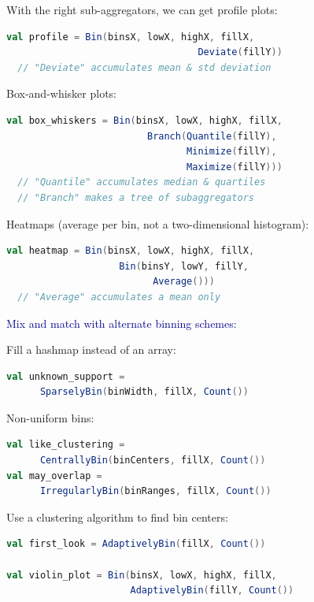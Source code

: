 \documentclass{beamer}
\begin{document}
\begin{frame}[fragile]{}
\vspace{0.5 cm}
With the right sub-aggregators, we can get profile plots:
\begin{lstlisting}[language=scala]
val profile = Bin(binsX, lowX, highX, fillX,
                                  Deviate(fillY))
  // "Deviate" accumulates mean & std deviation
\end{lstlisting}

Box-and-whisker plots:
\begin{lstlisting}[language=scala]
val box_whiskers = Bin(binsX, lowX, highX, fillX,
                         Branch(Quantile(fillY),
                                Minimize(fillY),
                                Maximize(fillY)))
  // "Quantile" accumulates median & quartiles
  // "Branch" makes a tree of subaggregators
\end{lstlisting}

Heatmaps (average per bin, not a two-dimensional histogram):
\begin{lstlisting}[language=scala]
val heatmap = Bin(binsX, lowX, highX, fillX,
                    Bin(binsY, lowY, fillY,
                          Average()))
  // "Average" accumulates a mean only
\end{lstlisting}
\end{frame}

\begin{frame}[fragile]{}
\textcolor{darkblue}{\large Mix and match with alternate binning schemes:}

\vspace{0.5 cm}
Fill a hashmap instead of an array:
\begin{lstlisting}[language=scala]
val unknown_support =
      SparselyBin(binWidth, fillX, Count())
\end{lstlisting}

Non-uniform bins:
\begin{lstlisting}[language=scala]
val like_clustering =
      CentrallyBin(binCenters, fillX, Count())
val may_overlap =
      IrregularlyBin(binRanges, fillX, Count())
\end{lstlisting}

Use a clustering algorithm to find bin centers:
\begin{lstlisting}[language=scala]
val first_look = AdaptivelyBin(fillX, Count())

val violin_plot = Bin(binsX, lowX, highX, fillX,
                      AdaptivelyBin(fillY, Count())
\end{lstlisting}
\end{frame}
\end{document}
